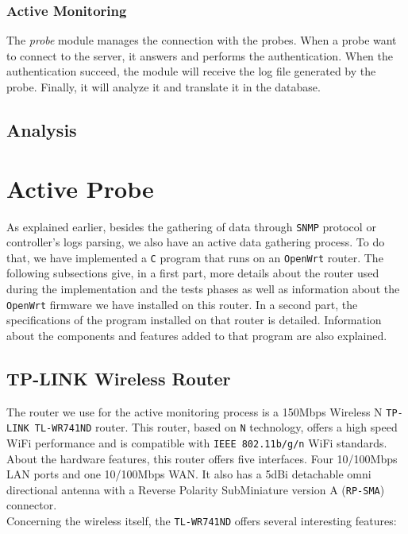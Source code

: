 \subsubsection{Active Monitoring}
The \emph{probe} module manages the connection with the probes. When a probe want to connect to the server, it answers and performs the authentication. When the authentication succeed, the module will receive the log file generated by the probe. Finally, it will analyze it and translate it in the database.

\subsection{Analysis}


\section{Active Probe}
As explained earlier, besides the gathering of data through \texttt{SNMP} protocol or controller's logs parsing, we also have an active data gathering process. To do that, we have implemented a \texttt{C} program that runs on an \texttt{OpenWrt} router. The following subsections give, in a first part, more details about the router used during the implementation and the tests phases as well as information about the \texttt{OpenWrt} firmware we have installed on this router. In a second part, the specifications of the program installed on that router is detailed. Information about the components and features added to that program are also explained.\\


\subsection{TP-LINK Wireless Router}
The router we use for the active monitoring process is a 150Mbps Wireless N \texttt{TP-LINK TL-WR741ND} router. This router, based on \texttt{N} technology, offers a high speed WiFi performance and is compatible with \texttt{IEEE 802.11b/g/n} WiFi standards. \\
About the hardware features, this router offers five interfaces. Four 10/100Mbps LAN ports and one 10/100Mbps WAN. It also has a 5dBi detachable omni directional antenna with a Reverse Polarity SubMiniature version A (\texttt{RP-SMA}) connector.\\
Concerning the wireless itself, the \texttt{TL-WR741ND} offers several interesting features\cite{tplink}:


